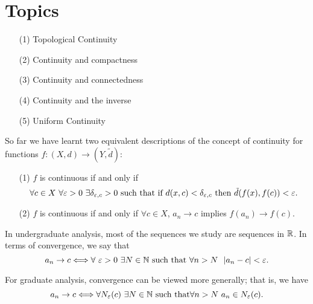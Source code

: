 \documentclass[a4paper]{article}
\begin{document}
\section{Topics}

\begin{enumerate}
    \item[(1)] Topological Continuity
    \item[(2)] Continuity and compactness
    \item[(3)] Continuity and connectedness
    \item[(4)] Continuity and the inverse
    \item[(5)] Uniform Continuity
\end{enumerate}

So far we have learnt two equivalent descriptions of the concept of continuity for functions \( f: (X,d) \to (Y,\tilde{d}) \):
\begin{enumerate}
    \item[(1)] \( f \) is continuous if and only if 
        \[  \text{\( \forall c \in X  \) \( \forall \epsilon > 0  \) \( \exists \delta_{\epsilon,c} > 0 \) such that if \( d(x,c) < \delta_{\epsilon, c} \) then \( \tilde{d}(f(x), f(c)) < \epsilon \)}. \]
    \item[(2)] \( f  \) is continuous if and only if \( \forall c \in X  \), \( {a}_{n} \to c  \) implies \( f({a}_{n}) \to f(c) \).
\end{enumerate}

In undergraduate analysis, most of the sequences we study are sequences in \( \R  \). In terms of convergence, we say that 
\[  {a}_{n} \to c \iff \forall \ \epsilon > 0 \ \exists N \in \N \ \text{such that} \ \forall n > N \ \ | {a}_{n} - c  |  < \epsilon. \]

For graduate analysis, convergence can be viewed more generally; that is, we have
\[  {a}_{n} \to c \iff \forall {N}_{\epsilon}(c) \ \exists N \in \N \ \text{such that} \forall n > N \ {a}_{n} \in {N}_{\epsilon}(c). \]
\end{document}
